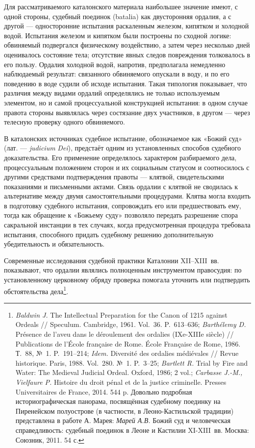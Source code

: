 Для рассматриваемого каталонского материала наибольшее значение имеют, с одной стороны, судебный поединок (batalia) как двусторонняя ордалия, а с другой --- односторонние испытания раскаленным железом, кипятком и холодной водой. Испытания железом и кипятком были построены по сходной логике: обвиняемый подвергался физическому воздействию, а затем через несколько дней оценивалось состояние тела; отсутствие явных следов повреждения толковалось в его пользу. Ордалия холодной водой, напротив, предполагала немедленно наблюдаемый результат: связанного обвиняемого опускали в воду, и по его поведению в воде судили об исходе испытания. Такая типология показывает, что различия между видами ордалий определялись не только используемым элементом, но и самой процессуальной конструкцией испытания: в одном случае правота стороны выявлялась через состязание двух участников, в другом --- через телесную проверку одного обвиняемого.

В каталонских источниках судебное испытание, обозначаемое как «Божий суд» (лат. --- \emph{judicium}\emph{ Dei}), предстаёт одним из установленных способов судебного доказательства. Его применение определялось характером разбираемого дела, процессуальным положением сторон и их социальным статусом и соотносилось с другими средствами подтверждения правоты --- клятвой, свидетельскими показаниями и письменными актами. Связь ордалии с клятвой не сводилась к альтернативе между двумя самостоятельными процедурами. Клятва могла входить в подготовку судебного испытания, сопровождать его или предшествовать ему, тогда как обращение к «Божьему суду» позволяло передать разрешение спора сакральной инстанции в тех случаях, когда предусмотренная процедура требовала испытания, способного придать судебному решению дополнительную убедительность и обязательность.

Современные исследования судебной практики Каталонии XII--XIII~вв. показывают, что ордалии являлись полноценным инструментом правосудия: по установленному церковному обряду проверка помогала уточнить или подтвердить обстоятельства дела\footnote{\emph{Baldwin J. }The Intellectual Preparation for the Canon of 1215 against Ordeals // Speculum. Cambridge, 1961. Vol.~36. P.~613--636;\emph{ Barthélemy D. }Présence de l’aveu dans le déroulement des ordalies (IXe-XIIIe siècle) // Publications de l’École française de Rome. École Française de Rome, 1986. Т.~88, №~1. P.~191--214; \emph{Idem. }Diversité des ordalies médiévales // Revue historique. Paris, 1988. Vol.~280. №~1. P.~3--25; \emph{Bartlett R. }Trial by Fire and Water: The Medieval Judicial Ordeal. Oxford, 1986; 2 vol.; \emph{Carbasse J.-M., Vielfaure P. }Histoire du droit pénal et de la justice criminelle. Presses Universitaires de France, 2014. 544 p. Довольно подробная историографическая панорама, посвящённая судебному поединку на Пиренейском полуострове (в частности, в Леоно-Кастильской традиции) представлена в работе А. Марея: \emph{Марей А.В.} Божий суд и человеческая справедливость: судебный поединок в Леоне и Кастилии XI-XIII~вв. Москва: Союзник, 2011. 54 с.}.

